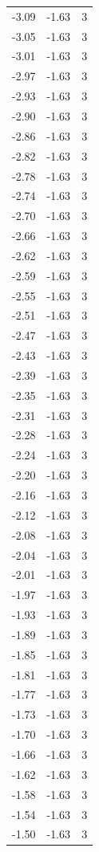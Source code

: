 \begin{longtable}{lrr}
  -3.09 & -1.63 & 3 \\
  -3.05 & -1.63 & 3 \\
  -3.01 & -1.63 & 3 \\
  -2.97 & -1.63 & 3 \\
  -2.93 & -1.63 & 3 \\
  -2.90 & -1.63 & 3 \\
  -2.86 & -1.63 & 3 \\
  -2.82 & -1.63 & 3 \\
  -2.78 & -1.63 & 3 \\
  -2.74 & -1.63 & 3 \\
  -2.70 & -1.63 & 3 \\
  -2.66 & -1.63 & 3 \\
  -2.62 & -1.63 & 3 \\
  -2.59 & -1.63 & 3 \\
  -2.55 & -1.63 & 3 \\
  -2.51 & -1.63 & 3 \\
  -2.47 & -1.63 & 3 \\
  -2.43 & -1.63 & 3 \\
  -2.39 & -1.63 & 3 \\
  -2.35 & -1.63 & 3 \\
  -2.31 & -1.63 & 3 \\
  -2.28 & -1.63 & 3 \\
  -2.24 & -1.63 & 3 \\
  -2.20 & -1.63 & 3 \\
  -2.16 & -1.63 & 3 \\
  -2.12 & -1.63 & 3 \\
  -2.08 & -1.63 & 3 \\
  -2.04 & -1.63 & 3 \\
  -2.01 & -1.63 & 3 \\
  -1.97 & -1.63 & 3 \\
  -1.93 & -1.63 & 3 \\
  -1.89 & -1.63 & 3 \\
  -1.85 & -1.63 & 3 \\
  -1.81 & -1.63 & 3 \\
  -1.77 & -1.63 & 3 \\
  -1.73 & -1.63 & 3 \\
  -1.70 & -1.63 & 3 \\
  -1.66 & -1.63 & 3 \\
  -1.62 & -1.63 & 3 \\
  -1.58 & -1.63 & 3 \\
  -1.54 & -1.63 & 3 \\
  -1.50 & -1.63 & 3 \\

\end{longtable}
